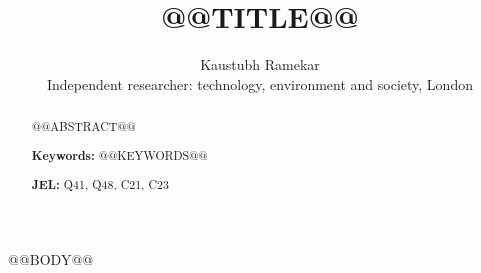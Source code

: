 \documentclass[11pt,a4paper]{article}
\title{@@TITLE@@}
\author{Kaustubh Ramekar\\[2pt]\small Independent researcher: technology, environment and society, London}
\date{}
\begin{document}
\maketitle

\begin{abstract}
\noindent @@ABSTRACT@@

\medskip
\noindent\textbf{Keywords:} @@KEYWORDS@@

\smallskip
\noindent\textbf{JEL:} Q41, Q48, C21, C23
\end{abstract}

@@BODY@@
\end{document}
